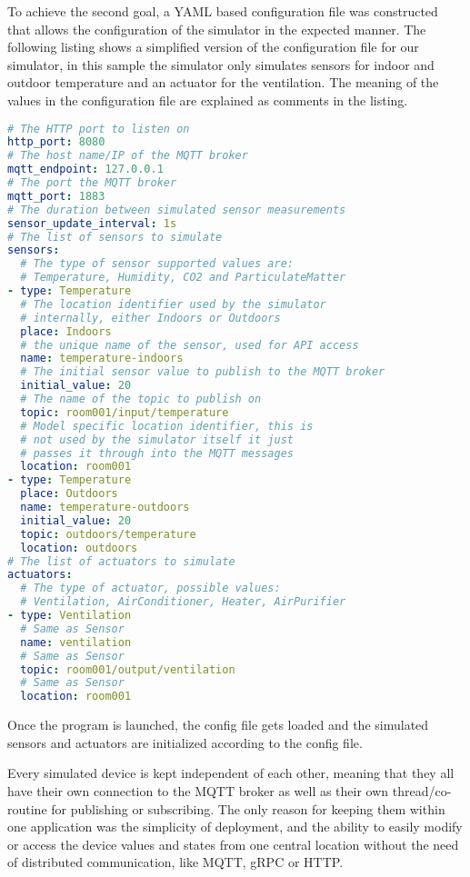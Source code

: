To achieve the second goal, a YAML based configuration file was
constructed that allows the configuration of the simulator in the
expected manner.
The following listing shows a simplified version of the
configuration file for our simulator, in this sample the simulator only
simulates sensors for indoor and outdoor temperature and an actuator for
the ventilation.
The meaning of the values in the configuration file are explained as comments in the listing.

\begin{lstlisting}[language=yaml]
# The HTTP port to listen on
http_port: 8080
# The host name/IP of the MQTT broker
mqtt_endpoint: 127.0.0.1
# The port the MQTT broker
mqtt_port: 1883
# The duration between simulated sensor measurements
sensor_update_interval: 1s
# The list of sensors to simulate
sensors:
  # The type of sensor supported values are:
  # Temperature, Humidity, CO2 and ParticulateMatter
- type: Temperature
  # The location identifier used by the simulator
  # internally, either Indoors or Outdoors
  place: Indoors
  # the unique name of the sensor, used for API access
  name: temperature-indoors
  # The initial sensor value to publish to the MQTT broker
  initial_value: 20
  # The name of the topic to publish on
  topic: room001/input/temperature
  # Model specific location identifier, this is
  # not used by the simulator itself it just
  # passes it through into the MQTT messages
  location: room001
- type: Temperature
  place: Outdoors
  name: temperature-outdoors
  initial_value: 20
  topic: outdoors/temperature
  location: outdoors
# The list of actuators to simulate
actuators:
  # The type of actuator, possible values:
  # Ventilation, AirConditioner, Heater, AirPurifier
- type: Ventilation
  # Same as Sensor
  name: ventilation
  # Same as Sensor
  topic: room001/output/ventilation
  # Same as Sensor
  location: room001
\end{lstlisting}

Once the program is launched, the config file gets loaded and the
simulated sensors and actuators are initialized according to the config
file.

Every simulated device is kept independent of each other, meaning that
they all have their own connection to the MQTT broker as well as their
own thread/co-routine for publishing or subscribing.
The only reason for
keeping them within one application was the simplicity of deployment, and
the ability to easily modify or access the device values and states from
one central location without the need of distributed communication, like
MQTT, gRPC or HTTP.

